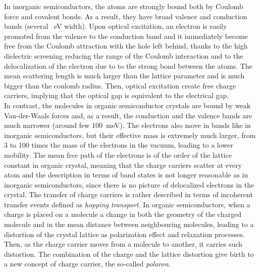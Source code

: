 \documentclass  [
  paper    = a4,
  BCOR     = 10mm,
  twoside,
  fontsize = 12pt,
  fleqn,
  toc      = bibnumbered,
  toc      = listofnumbered,
  numbers  = noendperiod,
  headings = normal,
  listof   = leveldown,
  version  = 3.03
]                                       {scrreprt}
\begin{document}
In inorganic semiconductors, the atoms are strongly bound both by Coulomb force and covalent bonds. As a result, they have broad valence and conduction bands (several \SI{}{\electronvolt} width). Upon optical excitation, an electron is easily promoted from the valence to the conduction band and it immediately become free from the Coulomb attraction with the hole left behind, thanks to the high dielectric screening reducing the range of the Coulomb interaction and to the delocalization of the electron due to to the strong bond between the atoms. The mean scattering length is much larger than the lattice parameter and is much bigger than the coulomb radius. Then, optical excitation create free charge carriers, implying that the optical gap is equivalent to the electrical gap.\\
In contrast, the molecules in organic semiconductor crystals are bound by weak Van-der-Waals forces and, as a result, the conduction and the valence bands are much narrower (around few \SI{100}{\milli\electronvolt}). The electrons also move in bands like in inorganic semiconductors, but their effective mass is extremely much larger, from $3$ to $100$ times the mass of the electrons in the vacuum, leading to a lower mobility. The mean free path of the electrons is of the order of the lattice constant in organic crystal, meaning that the charge carriers scatter at every atom and the description in terms of band states is not longer reasonable as in inorganic semiconductors, since there is no picture of delocalized electrons in the crystal. The transfer of charge carriers is rather described in terms of incoherent transfer events defined as \emph{hopping transport}. 
In organic semiconductors, when a charge is placed on a molecule a change in both the geometry of the charged molecule and in the mean distance between neighbouring molecules, leading to a distortion of the crystal lattice as polarization effect and relaxation processes. Then, as the charge carrier moves from a molecule to another, it carries such distortion. The combination of the charge and the lattice distortion give birth to a new concept of charge carrier, the so-called \emph{polaron}. \\
 
\end{document}
